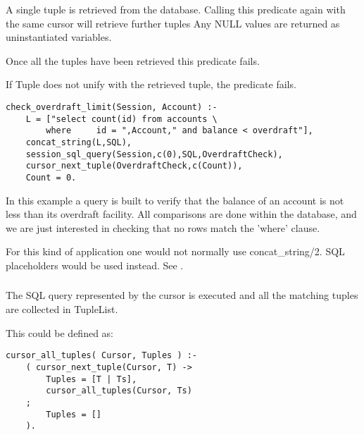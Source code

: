 A single tuple is retrieved from the database.  Calling this
predicate again with the same cursor will retrieve further tuples
Any NULL values are returned as uninstantiated variables.

Once all the tuples have been retrieved this predicate fails.

If Tuple does not unify with the retrieved tuple, the predicate fails.

\begin{verbatim}
check_overdraft_limit(Session, Account) :-
    L = ["select count(id) from accounts \
        where     id = ",Account," and balance < overdraft"],
    concat_string(L,SQL),
    session_sql_query(Session,c(0),SQL,OverdraftCheck),
    cursor_next_tuple(OverdraftCheck,c(Count)),
    Count = 0.
\end{verbatim}
In this example a query is built to verify that the balance of an
account is not less than its overdraft facility. All comparisons
are done within the database, and we are just interested in checking
that no rows match the 'where' clause.

For this kind of application one would not normally use
concat_string/2. SQL placeholders would be used instead. See
.


\subsubsection
{}
\label{cursor-all-tuples/2}

The SQL query represented by the cursor is executed and all
the matching tuples are collected in TupleList.

This could be defined as:

\begin{verbatim}
cursor_all_tuples( Cursor, Tuples ) :-
    ( cursor_next_tuple(Cursor, T) ->
        Tuples = [T | Ts],
        cursor_all_tuples(Cursor, Ts)
    ;
        Tuples = []
    ).
\end{verbatim}

\subsubsection
{}
\label{cursor-N-tuples/4}

